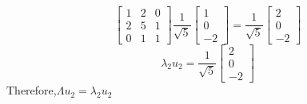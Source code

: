 \begin{enumerate}
\begin{itemize}
\[                \begin{bmatrix}
                     1 & 2 & 0 \\
                     2 & 5 & 1 \\
                     0 & 1 & 1 
                \end{bmatrix} \frac{1}{\sqrt{5}} 
                \begin{bmatrix}
                    1 \\ 0 \\ -2
                \end{bmatrix} = \frac{1}{\sqrt{5}}\begin{bmatrix}
                    2 \\ 0 \\ -2
                \end{bmatrix}
            \]
            \[
                \lambda_2 u_2 = \frac{1}{\sqrt{5}} \begin{bmatrix}
                    2 \\ 0 \\ -2
                  \end{bmatrix}
            \]
            Therefore,\(\Lambda u_2 = \lambda_2 u_2\)
            

\end{itemize}
\end{enumerate}
